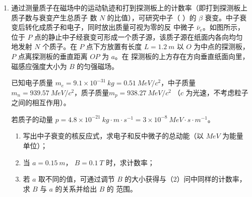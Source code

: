 \begin{enumerate}




\newpage

\item 
通过测量质子在磁场中的运动轨迹和打到探测板上的计数率（即打到探测板上质子数与衰变产生总质子
数 $ N $ 的比值），可研究中子（  ）的 $ \beta $ 衰变。中子衰变后转化成质子和电子，同时放出质量可视为零的反
中微子 $ \bar{\nu}_{e} $。如图所示，位于 $ P $ 点的静止中子经衰变可形成一个质子源，该质子源在纸面内各向均匀地发射
$ N $ 个质子。在 $ P $ 点下方放置有长度 $ L=1.2 \ m $ 以 $ O $ 为中点的探测板，$ P $ 点离探测板的垂直距离 $ OP $ 为 $ a $。在
探测板的上方存在方向垂直纸面向里，磁感应强度大小为 $ B $ 的匀强磁场。

已知电子质量 $ m_e=9.1 \times10^{-31} \ kg=0.51 \ MeV/c^{2} $，中子质量 $ m_n=939.57 \ MeV/c^{2} $，质子质量$ m_p=938.27 \ MeV/c^{2} $ （$ c $ 为光速，不考虑粒子之间的相互作用）。

若质子的动量 $ p=4.8\times10^{-21} \ kg \cdot m \cdot s^{-1}=3 \times 10^{-8} \ MeV \cdot s \cdot m^{-1} $。
\begin{enumerate}
\item
写出中子衰变的核反应式，求电子和反中微子的总动能（以 $ MeV $ 为能量单位）；
\item 
当 $ a=0.15 \ m $， $ B=0.1 \ T $ 时，求计数率；
\item 
若 $ a $ 取不同的值，可通过调节 $ B $ 的大小获得与（$ 2 $）问中同样的计数率，求 $ B $ 与 $ a $ 的关系并给出 $ B $ 的
范围。



\end{enumerate}
\end{enumerate}
